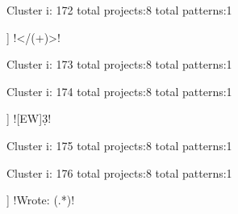 Cluster i: 172
total projects:8
total patterns:1
\begin{multicols}{1}
\begin{description}[noitemsep,topsep=0pt]
\item [[8] ] \cverb!</(\w+)>!
\end{description}
\end{multicols}







Cluster i: 173
total projects:8
total patterns:1
\begin{multicols}{1}
\begin{description}[noitemsep,topsep=0pt]
\item [[8] ] \cverb!} (\w+);!
\end{description}
\end{multicols}







Cluster i: 174
total projects:8
total patterns:1
\begin{multicols}{1}
\begin{description}[noitemsep,topsep=0pt]
\item [[8] ] \cverb![EW]\d{3}!
\end{description}
\end{multicols}







Cluster i: 175
total projects:8
total patterns:1
\begin{multicols}{1}
\end{multicols}







Cluster i: 176
total projects:8
total patterns:1
\begin{multicols}{1}
\begin{description}[noitemsep,topsep=0pt]
\item [[8] ] \cverb!Wrote: (.*)!
\end{description}
\end{multicols}







